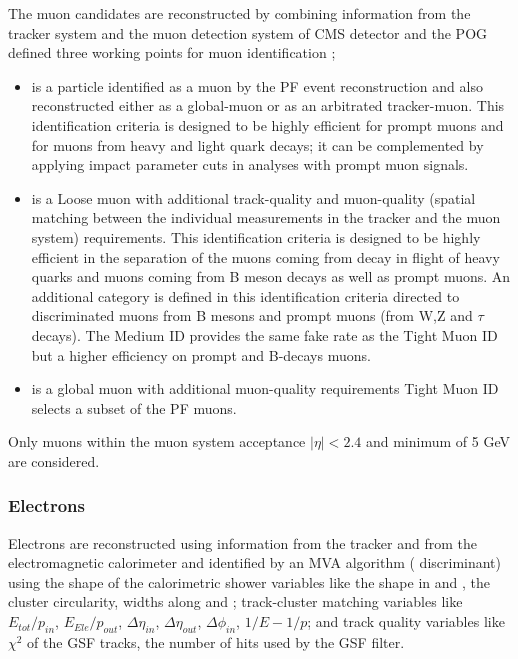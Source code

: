 The muon candidates are reconstructed by combining information from the tracker system and the muon detection system of CMS detector and the POG defined three working points for muon identification \cite{muid};

\begin{itemize}
\item {} is a particle identified as a muon by the PF event reconstruction and also reconstructed either as a global-muon or as an arbitrated tracker-muon. This identification criteria is designed to be highly efficient for prompt muons and for muons from heavy and light quark decays; it can be complemented by applying impact parameter cuts in analyses with prompt muon signals.
\item {} is a Loose muon with additional track-quality and muon-quality (spatial matching between the individual measurements in the tracker and the muon system) requirements. This identification criteria is designed to be highly efficient in the separation of the muons coming from decay in flight of heavy quarks and muons coming from B meson decays as well as prompt muons. An additional category  is defined in this identification criteria directed to discriminated muons from B mesons and prompt muons (from W,Z and $\tau$ decays). The Medium ID provides the same fake rate as the Tight Muon ID but a higher efficiency on prompt and B-decays muons.\cite{medium_muon}
\item {} is a global muon with additional muon-quality requirements Tight Muon ID selects a subset of the PF muons.  
\end{itemize}

Only muons within the muon system acceptance $|\eta| < 2.4$ and minimum \pt  of 5 GeV are considered. %

\subsubsection*{Electrons}

Electrons are reconstructed using information from the tracker and from the electromagnetic calorimeter and identified by an MVA algorithm ( discriminant) using the shape of the calorimetric shower variables like the shape in \etac and \phic, the cluster circularity, widths along \etac and \phic; track-cluster matching variables like $E_{tot}/p_{in}$, $E_{Ele}/p_{out}$, $\Delta \eta_{in}$,  $\Delta \eta_{out}$, $\Delta \phi_{in}$, $1/E - 1/p$; and track quality variables like $\chi^2$ of the GSF tracks, the number of hits used by the GSF filter\cite{mva_eid}.


